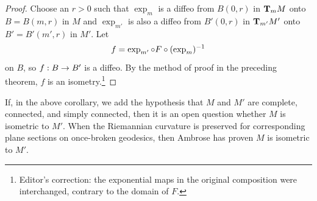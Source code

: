 \documentclass[../main]{subfiles}
\begin{document}
\begin{proof} 
Choose an $r>0$ such that $\exp_m$ is a diffeo from $B(0,r)$ in $\ts Mm$ onto $B=B(m,r)$ in $M$ and $\exp_{m'}$ is also a diffeo from $B'(0,r)$ in $\ts{M'}{m'}$ onto $B'=B'(m',r)$ in $M'$. Let
\[f=\exp_{m'}\circ F\circ(\exp_m)\inv\]
on $B$, so $f:B\functionMaps B'$ is a diffeo. By the method of proof in the preceding theorem, $f$ is an isometry.\footnote{Editor's correction: the exponential maps in the original composition were interchanged, contrary to the domain of $F$.}
\end{proof}



If, in the above corollary, we add the hypothesis that $M$ and $M'$ are complete, connected, and simply connected, then it is an open question whether $M$ is isometric to $M'$. When the Riemannian curvature is preserved for corresponding plane sections on once-broken geodesics, then Ambrose \cite{ambrose1956parallel} has proven $M$ is isometric to $M'$.
\end{document}
